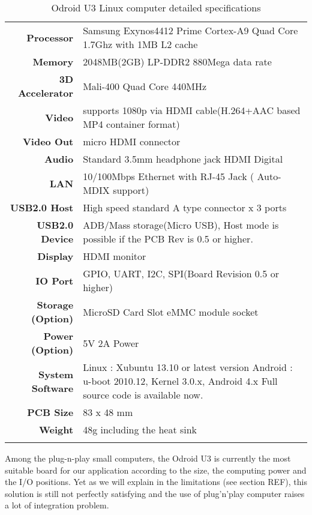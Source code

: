 \begin{table}[!t]
    \begin{center}
        \begin{tabularx}{\linewidth}{r X}
        \textbf{Processor} & Samsung Exynos4412 Prime Cortex-A9 Quad Core 1.7Ghz with 1MB L2 cache\\
        \textbf{Memory} & 2048MB(2GB) LP-DDR2 880Mega data rate\\
        \textbf{3D Accelerator} & Mali-400 Quad Core 440MHz\\
        \textbf{Video} & supports 1080p via HDMI cable(H.264+AAC based MP4 container format)\\
        \textbf{Video Out} & micro HDMI connector\\
        \textbf{Audio} & Standard 3.5mm headphone jack HDMI Digital\\
        \textbf{LAN} & 10/100Mbps Ethernet with RJ-45 Jack ( Auto-MDIX support)\\
        \textbf{USB2.0 Host} & High speed standard A type connector x 3 ports\\
        \textbf{USB2.0 Device} & ADB/Mass storage(Micro USB), Host mode is possible if the PCB Rev is 0.5 or higher.\\
        \textbf{Display} & HDMI monitor\\
        \textbf{IO Port} & GPIO, UART, I2C, SPI(Board Revision 0.5 or higher)\\
        \textbf{Storage (Option)} & MicroSD Card Slot eMMC module socket\\
        \textbf{Power (Option)} & 5V 2A Power\\
        \textbf{System Software} & Linux : Xubuntu 13.10 or latest version Android : u-boot 2010.12, Kernel 3.0.x, Android 4.x  Full source code is available now.\\
        \textbf{PCB Size} & 83 x 48 mm\\
        \textbf{Weight} & 48g including the heat sink\\
         & \\
        \end{tabularx}
        \caption{Odroid U3 Linux computer detailed specifications}
        \label{tab:table_feet}
    \end{center}
\end{table}

Among the plug-n-play small computers, the Odroid U3 is currently the most suitable board for our application according to the size, the computing power and the I/O positions.
Yet as we will explain in the limitations (see section REF), this solution is still not perfectly satisfying and the use of plug'n'play computer raises a lot of integration problem.

